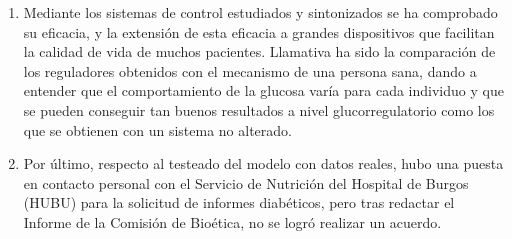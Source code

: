 \begin{enumerate}
    \item Mediante los sistemas de control estudiados y sintonizados se ha comprobado su eficacia, y la extensión de esta eficacia a grandes dispositivos que facilitan la calidad de vida de muchos pacientes. Llamativa ha sido la comparación de los reguladores obtenidos con el mecanismo de una persona sana, dando a entender que el comportamiento de la glucosa varía para cada individuo y que se pueden conseguir tan buenos resultados a nivel glucorregulatorio como los que se obtienen con un sistema no alterado.
    \item Por último, respecto al testeado del modelo con datos reales, hubo una puesta en contacto personal con el Servicio de Nutrición del Hospital de Burgos (HUBU) para la solicitud de informes diabéticos, pero tras redactar el Informe de la Comisión de Bioética, no se logró realizar un acuerdo.
\end{enumerate}


